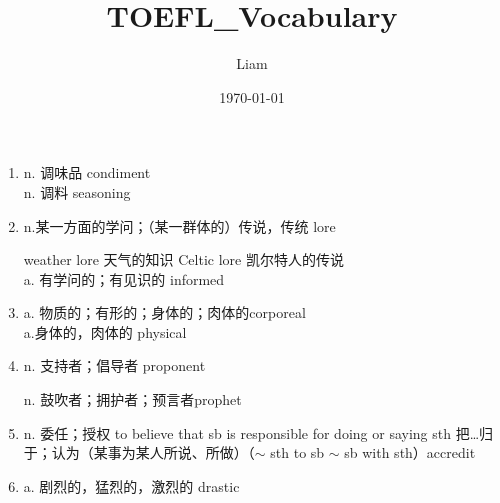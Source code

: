 \documentclass[UTF8]{ctexart}
\title{TOEFL\_Vocabulary}
\author{Liam}
\date{\today}
\begin{document}
\maketitle
\begin{enumerate}
\section{第一章}    
\item n. 调味品   condiment  \\n. 调料   seasoning 
\item  n.某一方面的学问；（某一群体的）传说，传统   lore

weather lore 天气的知识
Celtic lore 凯尔特人的传说\\a. 有学问的；有见识的    informed 
\item a. 物质的；有形的；身体的；肉体的corporeal \\a.身体的，肉体的 physical
\item n. 支持者；倡导者    proponent    

n. 鼓吹者；拥护者；预言者\qquad prophet 
\item n. 委任；授权    to believe that sb is responsible for doing or saying sth 把…归于；认为（某事为某人所说、所做）（$\sim$ sth to sb \quad $\sim$ sb with sth）\qquad accredit
\item a. 剧烈的，猛烈的，激烈的  drastic  


\end{enumerate}
\end{document}
